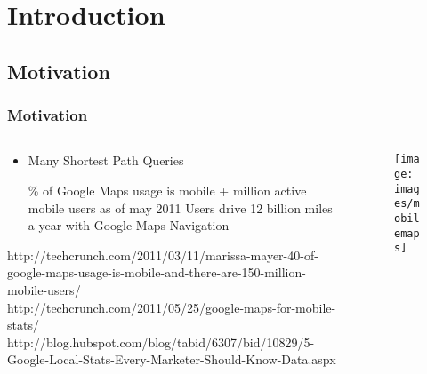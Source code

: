 
\section{Introduction} %


\subsection{Motivation}
\begin{frame}[red] %
\frametitle{Motivation} 
\begin{columns}
  \begin{column}{0.5\textwidth}
    \begin{itemize} \vspace{-1.5em}
      \item Many Shortest Path Queries
      \begin{itemize} 
       \% of Google Maps usage is mobile %
      + million active mobile users as of may 2011
      \gitem Users drive 12 billion miles a year with Google Maps Navigation
      \end{itemize}
    \end{itemize}
  {
      \tiny \color{lightgray}
       http://techcrunch.com/2011/03/11/marissa-mayer-40-of-google-maps-usage-is-mobile-and-there-are-150-million-mobile-users/ \\
       http://techcrunch.com/2011/05/25/google-maps-for-mobile-stats/ \\
       http://blog.hubspot.com/blog/tabid/6307/bid/10829/5-Google-Local-Stats-Every-Marketer-Should-Know-Data.aspx \\
  }
  \end{column}
  \begin{column}[t]{0.5\textwidth}
  \vspace{-2em}
    \begin{figure}
    \texttt{[image: images/mobilemaps]} 
    \end{figure}
  \end{column}
\end{columns}
\end{frame}

